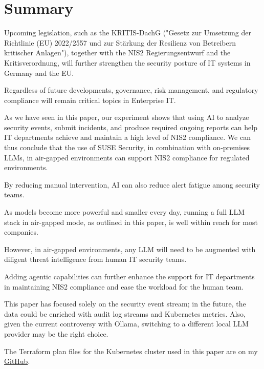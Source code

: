%
%

\pagebreak
\section{Summary}

\onehalfspacing

Upcoming legislation, such as the KRITIS-DachG ("Gesetz zur Umsetzung der Richtlinie (EU) 2022/2557 und zur Stärkung der Resilienz von Betreibern kritischer Anlagen"), together with the NIS2 Regierungsentwurf and the Kritisverordnung, will further strengthen the security posture of IT systems in Germany and the EU.

Regardless of future developments, governance, risk management, and regulatory compliance will remain critical topics in Enterprise IT.

As we have seen in this paper, our experiment shows that using AI to analyze security events, submit incidents, and produce required ongoing reports can help IT departments achieve and maintain a high level of NIS2 compliance. We can thus conclude that the use of SUSE Security, in combination with on-premises LLMs, in air-gapped environments can support NIS2 compliance for regulated environments.

By reducing manual intervention, AI can also reduce alert fatigue among security teams.

As models become more powerful and smaller every day, running a full LLM stack in air-gapped mode, as outlined in this paper, is well within reach for most companies.

However, in air-gapped environments, any LLM will need to be augmented with diligent threat intelligence from human IT security teams.

Adding agentic capabilities can further enhance the support for IT departments in maintaining NIS2 compliance and ease the workload for the human team.

This paper has focused solely on the security event stream; in the future, the data could be enriched with audit log streams and Kubernetes metrics. Also, given the current controversy with Ollama, switching to a different local LLM provider may be the right choice.

The Terraform plan files for the Kubernetes cluster used in this paper are on my \href{https://github.com/chfrank-cgn/Rancher}{GitHub}.
